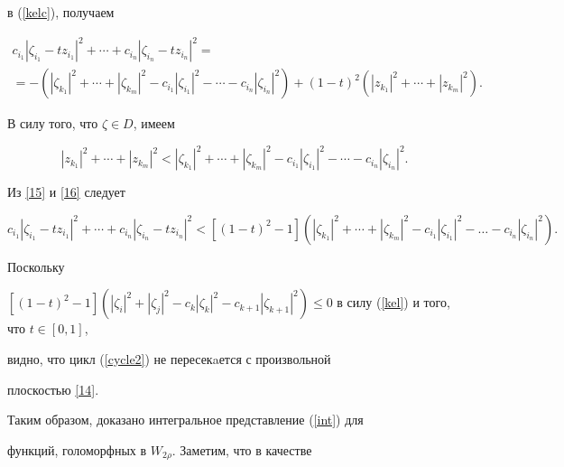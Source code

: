 \begin{pf}
в (\ref{kelc}), получаем


\begin{multline}\label{15}


c_{i_1}|\zeta_{i_1}-tz_{i_1}|^2+\dotsb+c_{i_n}


|\zeta_{i_n}-tz_{i_n}|^2 =\\


%


=-(|\zeta_{k_1}|^2+\dotsb+|\zeta_{k_m}|^2-c_{i_1}|\zeta_{i_1}|^2-


\dotsb-c_{i_n}|\zeta_{i_n}|^2)+(1-t)^2(|z_{k_1}|^2+\dotsb+|z_{k_m}|^2).


\end{multline}


В силу того, что $\zeta\in D$, имеем


\begin{equation}\label{16}


|z_{k_1}|^2+\dotsb+|z_{k_m}|^2<


|\zeta_{k_1}|^2+\dotsb+|\zeta_{k_m}|^2-c_{i_1}|\zeta_{i_1}|^2


-\dotsb-c_{i_n}|\zeta_{i_n}|^2.


\end{equation}


Из \eqref{15} и \eqref{16} следует


$$


c_{i_1}|\zeta_{i_1}-tz_{i_1}|^2+\dotsb+c_{i_n}


|\zeta_{i_n}-tz_{i_n}|^2 < 


[(1-t)^2-1](|\zeta_{k_1}|^2+\dotsb+|\zeta_{k_m}|^2-c_{i_1}


|\zeta_{i_1}|^2-\dotsc-c_{i_n}|\zeta_{i_n}|^2).


$$


Поскольку


$[(1-t)^2-1](|\zeta_i|^2+|\zeta_j|^2-c_k|\zeta_k|^2-c_{k+1}|\zeta_{k+1}|^2)


\leqslant 0$ в силу (\ref{kel}) и того, что $t\in [0,1]$,


видно, что цикл (\ref{cycle2}) не пересекaется с произвольной


плоскостью \eqref{14}.


\end{pf}





Таким образом, доказано интегральное представление (\ref{int}) для


функций, голоморфных в $W_{2\rho}$. Заметим, что в качестве


